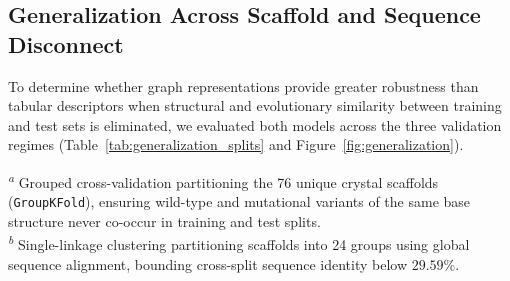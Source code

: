 \documentclass[journal=jcisd8,manuscript=article]{achemso}
\begin{document}
\subsection{Generalization Across Scaffold and Sequence Disconnect}
To determine whether graph representations provide greater robustness than tabular descriptors when structural and evolutionary similarity between training and test sets is eliminated, we evaluated both models across the three validation regimes (Table~\ref{tab:generalization_splits} and Figure~\ref{fig:generalization}).

\begin{table}[htbp]
\centering
\caption{Performance Comparison of Curated XGBoost versus FiLM-RGCN across Three Cross-Validation Regimes ($N=364$)}
\label{tab:generalization_splits}
\vspace{1ex}
\raggedright
\footnotesize
\textsuperscript{\emph{a}} Grouped cross-validation partitioning the 76 unique crystal scaffolds (\texttt{GroupKFold}), ensuring wild-type and mutational variants of the same base structure never co-occur in training and test splits.\\
\textsuperscript{\emph{b}} Single-linkage clustering partitioning scaffolds into 24 groups using global sequence alignment, bounding cross-split sequence identity below $29.59\%$.
\end{table}
\end{document}
